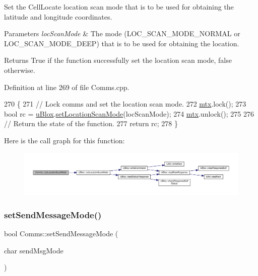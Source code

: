 Set the Cell\+Locate location scan mode that is to be used for obtaining the latitude and longitude coordinates.


\begin{DoxyParams}{Parameters}
{\em loc\+Scan\+Mode} & The mode (L\+O\+C\+\_\+\+S\+C\+A\+N\+\_\+\+M\+O\+D\+E\+\_\+\+N\+O\+R\+M\+AL or L\+O\+C\+\_\+\+S\+C\+A\+N\+\_\+\+M\+O\+D\+E\+\_\+\+D\+E\+EP) that is to be used for obtaining the location. \\
\hline
\end{DoxyParams}
\begin{DoxyReturn}{Returns}
True if the function successfully set the location scan mode, false otherwise. 
\end{DoxyReturn}


Definition at line 269 of file Comms.\+cpp.


\begin{DoxyCode}
270 \{
271     \textcolor{comment}{// Lock comms and set the location scan mode.}
272     \hyperlink{class_comms_a21df861b1202573e4cd0cb5666d638fe}{mtx}.lock();
273     \textcolor{keywordtype}{bool} rc = \hyperlink{class_comms_ac64dea134b116147e5441172346dbd6c}{uBlox}.\hyperlink{class_u_blox_aabed44fd41e16c9d1a8daba80f3bef06}{setLocationScanMode}(locScanMode);
274     \hyperlink{class_comms_a21df861b1202573e4cd0cb5666d638fe}{mtx}.unlock();
275 
276     \textcolor{comment}{// Return the state of the function.}
277     \textcolor{keywordflow}{return} rc;
278 \}
\end{DoxyCode}
Here is the call graph for this function\+:\nopagebreak
\begin{figure}[H]
\begin{center}
\leavevmode
\includegraphics[width=350pt]{d8/dcc/class_comms_a73c0cd58db7daf118bd0b1726fc9dded_cgraph}
\end{center}
\end{figure}
\mbox{\label{class_comms_a1b6f5cafba74fc0e175f057e15656362}} 
\subsubsection{\texorpdfstring{set\+Send\+Message\+Mode()}{setSendMessageMode()}}
{\footnotesize\ttfamily bool Comms\+::set\+Send\+Message\+Mode (\begin{DoxyParamCaption}\item[{char}]{send\+Msg\+Mode }\end{DoxyParamCaption})}

